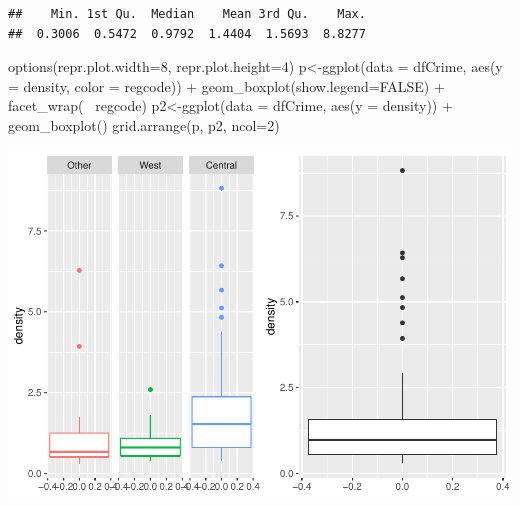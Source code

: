 \documentclass[]{article}
\newenvironment{Shaded}{}{}
\newcommand{\DataTypeTok}[1]{#1}
\newcommand{\DecValTok}[1]{#1}
\newcommand{\KeywordTok}[1]{\textcolor[rgb]{0.00,0.00,1.00}{#1}}
\newcommand{\NormalTok}[1]{#1}
\newcommand{\OperatorTok}[1]{#1}
\newcommand{\OtherTok}[1]{\textcolor[rgb]{1.00,0.25,0.00}{#1}}
\newcommand{\StringTok}[1]{\textcolor[rgb]{0.00,0.50,0.50}{#1}}
\begin{document}
\begin{Shaded}
\end{Shaded}

\begin{verbatim}
##    Min. 1st Qu.  Median    Mean 3rd Qu.    Max. 
##  0.3006  0.5472  0.9792  1.4404  1.5693  8.8277
\end{verbatim}

\begin{Shaded}
\begin{Highlighting}[]
\KeywordTok{options}\NormalTok{(}\DataTypeTok{repr.plot.width=}\DecValTok{8}\NormalTok{, }\DataTypeTok{repr.plot.height=}\DecValTok{4}\NormalTok{)}
\NormalTok{p<-}\KeywordTok{ggplot}\NormalTok{(}\DataTypeTok{data =}\NormalTok{ dfCrime, }\KeywordTok{aes}\NormalTok{(}\DataTypeTok{y =}\NormalTok{ density, }\DataTypeTok{color =}\NormalTok{ regcode)) }\OperatorTok{+}
\StringTok{     }\KeywordTok{geom_boxplot}\NormalTok{(}\DataTypeTok{show.legend=}\OtherTok{FALSE}\NormalTok{) }\OperatorTok{+}\StringTok{ }\KeywordTok{facet_wrap}\NormalTok{(}\OperatorTok{~}\StringTok{ }\NormalTok{regcode)}
\NormalTok{p2<-}\KeywordTok{ggplot}\NormalTok{(}\DataTypeTok{data =}\NormalTok{ dfCrime, }\KeywordTok{aes}\NormalTok{(}\DataTypeTok{y =}\NormalTok{ density)) }\OperatorTok{+}
\StringTok{     }\KeywordTok{geom_boxplot}\NormalTok{()}
\KeywordTok{grid.arrange}\NormalTok{(p, p2, }\DataTypeTok{ncol=}\DecValTok{2}\NormalTok{)}
\end{Highlighting}
\end{Shaded}

\includegraphics{Bagnard_Gaustad_Hartman_Leung_Lab_3_files/figure-latex/unnamed-chunk-78-1.pdf}
\end{document}
